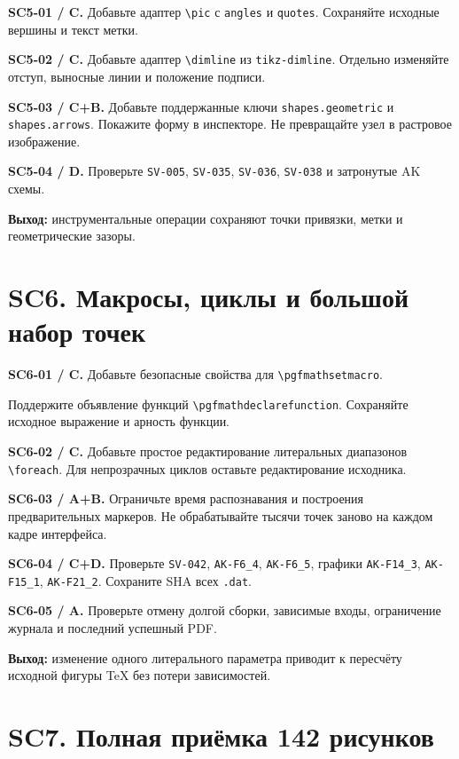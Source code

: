 \documentclass[11pt,a4paper,oneside]{scrreprt}
\begin{document}
\textbf{SC5-01 / C.} Добавьте адаптер \texttt{\textbackslash{}pic} с \texttt{angles} и \texttt{quotes}. Сохраняйте исходные вершины и текст метки.

\textbf{SC5-02 / C.} Добавьте адаптер \texttt{\textbackslash{}dimline} из \texttt{tikz-dimline}. Отдельно изменяйте отступ, выносные линии и положение подписи.

\textbf{SC5-03 / C+B.} Добавьте поддержанные ключи \texttt{shapes.geometric} и \texttt{shapes.arrows}. Покажите форму в инспекторе. Не превращайте узел в растровое изображение.

\textbf{SC5-04 / D.} Проверьте \texttt{SV-005}, \texttt{SV-035}, \texttt{SV-036}, \texttt{SV-038} и затронутые AK схемы.

\textbf{Выход:} инструментальные операции сохраняют точки привязки, метки и геометрические зазоры.

\section{SC6. Макросы, циклы и большой набор точек}\label{sc6.-ux43cux430ux43aux440ux43eux441ux44b-ux446ux438ux43aux43bux44b-ux438-ux431ux43eux43bux44cux448ux43eux439-ux43dux430ux431ux43eux440-ux442ux43eux447ux435ux43a}

\textbf{SC6-01 / C.} Добавьте безопасные свойства для \texttt{\textbackslash{}pgfmathsetmacro}.

Поддержите объявление функций \texttt{\textbackslash{}pgfmathdeclarefunction}. Сохраняйте исходное выражение и арность функции.

\textbf{SC6-02 / C.} Добавьте простое редактирование литеральных диапазонов \texttt{\textbackslash{}foreach}. Для непрозрачных циклов оставьте редактирование исходника.

\textbf{SC6-03 / A+B.} Ограничьте время распознавания и построения предварительных маркеров. Не обрабатывайте тысячи точек заново на каждом кадре интерфейса.

\textbf{SC6-04 / C+D.} Проверьте \texttt{SV-042}, \texttt{AK-F6\_4}, \texttt{AK-F6\_5}, графики \texttt{AK-F14\_3}, \texttt{AK-F15\_1}, \texttt{AK-F21\_2}. Сохраните SHA всех \texttt{.dat}.

\textbf{SC6-05 / A.} Проверьте отмену долгой сборки, зависимые входы, ограничение журнала и последний успешный PDF.

\textbf{Выход:} изменение одного литерального параметра приводит к пересчёту исходной фигуры TeX без потери зависимостей.

\section{SC7. Полная приёмка 142 рисунков}\label{sc7.-ux43fux43eux43bux43dux430ux44f-ux43fux440ux438ux451ux43cux43aux430-142-ux440ux438ux441ux443ux43dux43aux43eux432}
\end{document}
